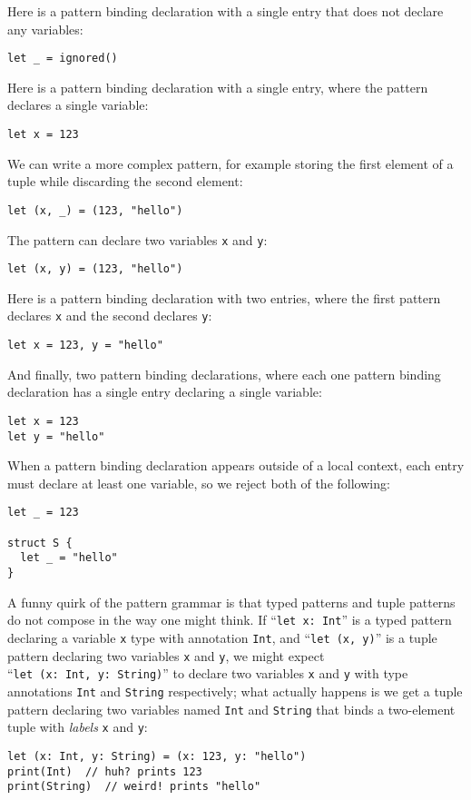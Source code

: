 \documentclass[../generics]{subfiles}
\begin{document}
Here is a pattern binding declaration with a single entry that does not declare any variables:
\begin{Verbatim}
let _ = ignored()
\end{Verbatim}
Here is a pattern binding declaration with a single entry, where the pattern declares a single variable:
\begin{Verbatim}
let x = 123
\end{Verbatim}
We can write a more complex pattern, for example storing the first element of a tuple while discarding the second element:
\begin{Verbatim}
let (x, _) = (123, "hello")
\end{Verbatim}
The pattern can declare two variables \texttt{x} and \texttt{y}:
\begin{Verbatim}
let (x, y) = (123, "hello")
\end{Verbatim}
Here is a pattern binding declaration with two entries, where the first pattern declares \texttt{x} and the second declares \texttt{y}:
\begin{Verbatim}
let x = 123, y = "hello"
\end{Verbatim}
And finally, two pattern binding declarations, where each one pattern binding declaration has a single entry declaring a single variable:
\begin{Verbatim}
let x = 123
let y = "hello"
\end{Verbatim}
When a pattern binding declaration appears outside of a local context, each entry must declare at least one variable, so we reject both of the following:
\begin{Verbatim}
let _ = 123

struct S {
  let _ = "hello"
}
\end{Verbatim}

A funny quirk of the pattern grammar is that typed patterns and tuple patterns do not compose in the way one might think. If ``\texttt{let x:~Int}'' is a typed pattern declaring a variable \texttt{x} type with annotation \texttt{Int}, and ``\texttt{let (x, y)}'' is a tuple pattern declaring two variables \texttt{x} and \texttt{y}, we might expect ``\texttt{let~(x:~Int,~y:~String)}'' to declare two variables \texttt{x} and \texttt{y} with type annotations \texttt{Int} and \texttt{String} respectively; what actually happens is we get a tuple pattern declaring two variables named \texttt{Int} and \texttt{String} that binds a two-element tuple with \emph{labels} \texttt{x} and \texttt{y}:
\begin{Verbatim}
let (x: Int, y: String) = (x: 123, y: "hello")
print(Int)  // huh? prints 123
print(String)  // weird! prints "hello"
\end{Verbatim}
\end{document}
